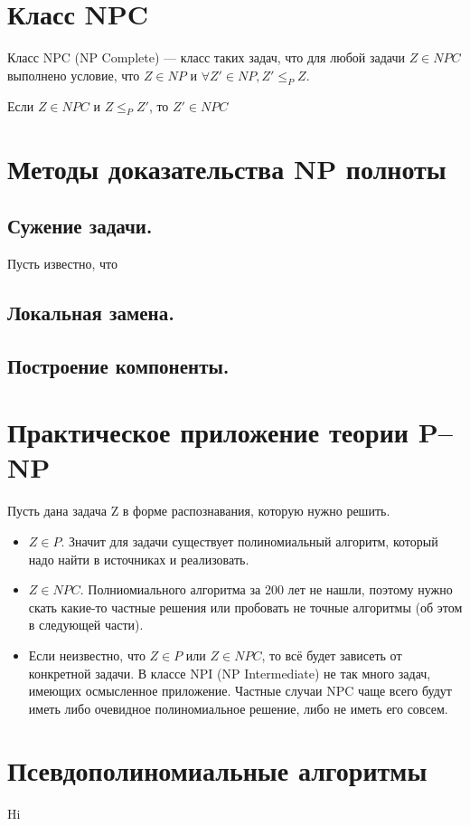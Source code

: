 \section{Класс NPC}
\begin{definition}
	Класс NPC (NP Complete) --- класс таких задач, что для любой задачи
	$Z\in NPC$ выполнено условие, что $Z\in NP$ и $\forall Z'\in NP, Z'
	\le_P Z$.
\end{definition}

\begin{lemma}
	Если $Z\in NPC$ и  $Z \le_P Z'$, то  $Z' \in NPC$
\end{lemma}



\section{Методы доказательства NP полноты}

\subsection*{Сужение задачи.}
Пусть известно, что 

\subsection*{Локальная замена.}

\subsection*{Построение компоненты.}


\section{Практическое приложение теории P--NP}

Пусть дана задача Z в форме распознавания, которую нужно решить. 
\begin{itemize}
	\item $Z\in P$. Значит для задачи существует полиномиальный алгоритм,
		который надо найти в источниках и реализовать.
	\item  $Z \in NPC$. Полниомиального алгоритма за 200 лет не нашли,
		поэтому нужно скать какие-то частные решения или пробовать не
		точные алгоритмы (об этом в следующей части).
	\item Если неизвестно, что  $Z\in P$ или  $Z \in NPC$, то всё будет
		зависеть от конкретной задачи. В классе NPI (NP Intermediate) не
		так много задач, имеющих осмысленное приложение. Частные случаи
		NPC чаще всего будут иметь либо очевидное полиномиальное
		решение, либо не иметь его совсем.
\end{itemize}

\section{Псевдополиномиальные алгоритмы}
Hi